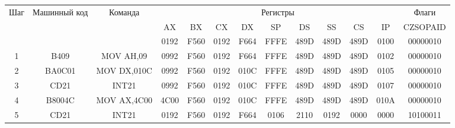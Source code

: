 \begin{tabular}{|c|c|c|c|c|c|c|c|c|c|c|c|c|}
\hline
	Шаг & Машинный код & Команда & \multicolumn{9}{|c|}{Регистры} & Флаги \\
	& & & AX & BX & CX & DX & SP & DS & SS & CS & IP & CZSOPAID \\
\hline
	& & & 0192 & F560 & 0192 & F664 & FFFE & 489D & 489D & 489D & 0100 & 00000010 \\
\hline
	1 & B409 & MOV AH,09 & 0992 & F560 & 0192 & F664 & FFFE & 489D & 489D & 489D & 0102 & 00000010 \\
\hline
	2 & BA0C01 & MOV DX,010C & 0992 & F560 & 0192 & 010C & FFFE & 489D & 489D & 489D & 0105 & 00000010 \\
\hline
	3 & CD21 & INT21 & 0992 & F560 & 0192 & 010C & FFFE & 489D & 489D & 489D & 0107 & 00000010 \\
\hline
	4 & B8004C & MOV AX,4C00 & 4C00 & F560 & 0192 & 010C & FFFE & 489D & 489D & 489D & 010A & 00000010 \\
\hline
	5 & CD21 & INT21 & 0192 & F560 & 0192 & F664 & 0106 & 2110 & 0192 & 0000 & 0000 & 10100011 \\
\hline
\end{tabular}
